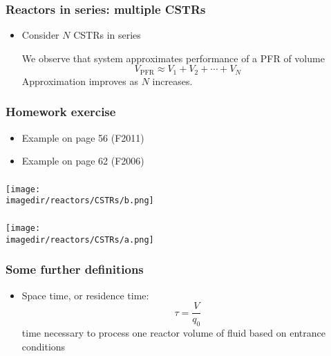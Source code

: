 \begin{frame}\frametitle{Reactors in series: multiple CSTRs}
	\begin{itemize}
		\item	Consider $N$ CSTRs in series

		We observe that system approximates performance of a PFR of volume $$V_\text{PFR} \approx V_1 + V_2 + \cdots + V_N$$ Approximation improves as $N$ increases.
	\end{itemize}
\end{frame}

\begin{frame}\frametitle{Homework exercise}
	\begin{itemize}
		\item	Example on page 56 (F2011)
		\item	Example on page 62 (F2006)
	\end{itemize}
\end{frame}

\begin{frame}\frametitle{}
	\begin{center}
		\texttt{[image: \\imagedir/reactors/CSTRs/b.png]}
	\end{center}
\end{frame}

\begin{frame}\frametitle{}
	\begin{center}
		\texttt{[image: \\imagedir/reactors/CSTRs/a.png]}
	\end{center}
\end{frame}

\begin{frame}\frametitle{Some further definitions}
	\begin{itemize}
		\item	Space time, or residence time:
		$$\tau = \frac{V}{q_0}$$ time necessary to process one reactor volume of fluid based on entrance conditions
	\end{itemize}
\end{frame}
